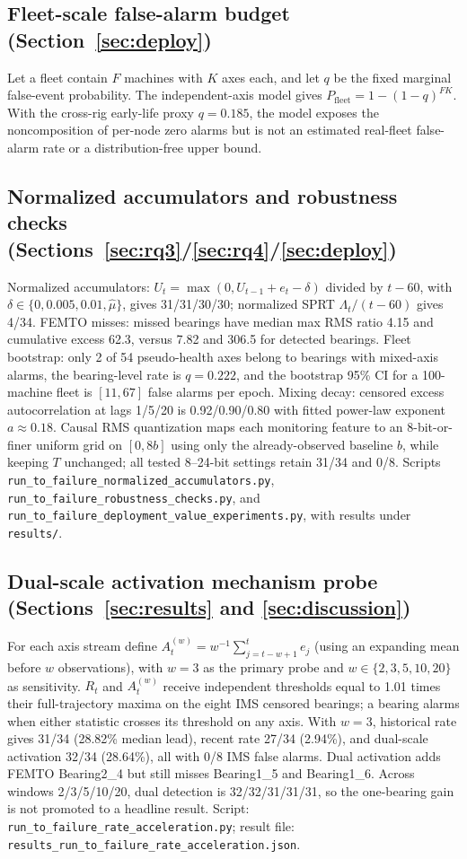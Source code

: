 \documentclass[journal]{IEEEtran}
\begin{document}
\subsection*{Fleet-scale false-alarm budget (Section~\ref{sec:deploy})}
Let a fleet contain $F$ machines with $K$ axes each, and let $q$ be the fixed marginal false-event probability. The independent-axis model gives $P_{\mathrm{fleet}}=1-(1-q)^{FK}$. With the cross-rig early-life proxy $q=0.185$, the model exposes the noncomposition of per-node zero alarms but is not an estimated real-fleet false-alarm rate or a distribution-free upper bound.

\subsection*{Normalized accumulators and robustness checks (Sections~\ref{sec:rq3}/\ref{sec:rq4}/\ref{sec:deploy})}
Normalized accumulators: $U_t=\max(0,U_{t-1}+e_t-\delta)$ divided by $t-60$, with $\delta\in\{0,0.005,0.01,\hat\mu\}$, gives 31/31/30/30; normalized SPRT $\Lambda_t/(t-60)$ gives 4/34. FEMTO misses: missed bearings have median max RMS ratio 4.15 and cumulative excess 62.3, versus 7.82 and 306.5 for detected bearings. Fleet bootstrap: only 2 of 54 pseudo-health axes belong to bearings with mixed-axis alarms, the bearing-level rate is $q=0.222$, and the bootstrap 95\% CI for a 100-machine fleet is $[11,67]$ false alarms per epoch. Mixing decay: censored excess autocorrelation at lags 1/5/20 is 0.92/0.90/0.80 with fitted power-law exponent $a\approx0.18$. Causal RMS quantization maps each monitoring feature to an 8-bit-or-finer uniform grid on $[0,8b]$ using only the already-observed baseline $b$, while keeping $T$ unchanged; all tested 8--24-bit settings retain 31/34 and 0/8. Scripts \texttt{run\_to\_failure\_normalized\_accumulators.py}, \texttt{run\_to\_failure\_robustness\_checks.py}, and \texttt{run\_to\_failure\_deployment\_value\_experiments.py}, with results under \texttt{results/}.

\subsection*{Dual-scale activation mechanism probe (Sections~\ref{sec:results} and \ref{sec:discussion})}
For each axis stream define $A_t^{(w)}=w^{-1}\sum_{j=t-w+1}^{t}e_j$ (using an expanding mean before $w$ observations), with $w=3$ as the primary probe and $w\in\{2,3,5,10,20\}$ as sensitivity. $R_t$ and $A_t^{(w)}$ receive independent thresholds equal to 1.01 times their full-trajectory maxima on the eight IMS censored bearings; a bearing alarms when either statistic crosses its threshold on any axis. With $w=3$, historical rate gives 31/34 (28.82\% median lead), recent rate 27/34 (2.94\%), and dual-scale activation 32/34 (28.64\%), all with 0/8 IMS false alarms. Dual activation adds FEMTO Bearing2\_4 but still misses Bearing1\_5 and Bearing1\_6. Across windows 2/3/5/10/20, dual detection is 32/32/31/31/31, so the one-bearing gain is not promoted to a headline result. Script: \texttt{run\_to\_failure\_rate\_acceleration.py}; result file: \texttt{results\_run\_to\_failure\_rate\_acceleration.json}.
\end{document}
